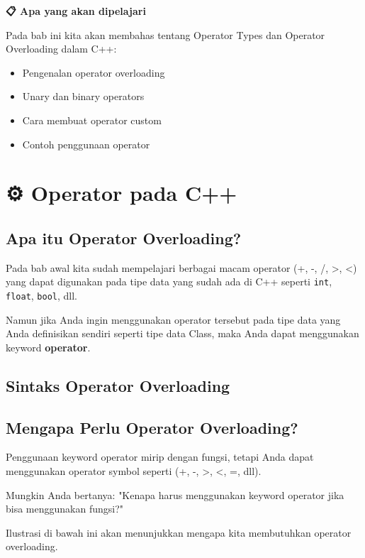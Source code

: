 \textbf{📋 Apa yang akan dipelajari}

Pada bab ini kita akan membahas tentang Operator Types dan Operator Overloading dalam C++:

\begin{itemize}
\item Pengenalan operator overloading
\item Unary dan binary operators
\item Cara membuat operator custom
\item Contoh penggunaan operator
\end{itemize}

\minitoc

\section{⚙️ Operator pada C++}\label{operator-pada-cpp}

\subsection{Apa itu Operator Overloading?}

Pada bab awal kita sudah mempelajari berbagai macam operator (+, -, /, >, <) yang dapat digunakan pada tipe data yang sudah ada di C++ seperti \texttt{int}, \texttt{float}, \texttt{bool}, dll.

Namun jika Anda ingin menggunakan operator tersebut pada tipe data yang Anda definisikan sendiri seperti tipe data Class, maka Anda dapat menggunakan keyword \textbf{operator}.

\subsection{Sintaks Operator Overloading}



\subsection{Mengapa Perlu Operator Overloading?}

Penggunaan keyword operator mirip dengan fungsi, tetapi Anda dapat menggunakan operator symbol seperti (+, -, >, <, =, dll).

Mungkin Anda bertanya: "Kenapa harus menggunakan keyword operator jika bisa menggunakan fungsi?"

Ilustrasi di bawah ini akan menunjukkan mengapa kita membutuhkan operator overloading.

